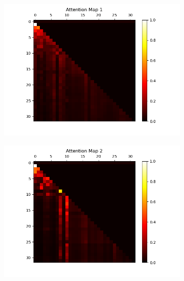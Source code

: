 \documentclass[10pt]{article}
\theoremstyle{definition}
\begin{document}
\begin{figure}[H]
    \centering
    \begin{subfigure}[b]{0.35\textwidth}
        \centering
        \includegraphics[width=\textwidth]{../data/plots/part2/attention_map_1.png}
        \label{subfig:am1}
    \end{subfigure}
    \begin{subfigure}[b]{0.35\textwidth}
        \centering
        \includegraphics[width=\textwidth]{../data/plots/part2/attention_map_2.png}
        \label{subfig:am2}
    \end{subfigure}
    \begin{subfigure}[b]{0.35\textwidth}
        \centering

\end{subfigure}
\end{figure}
\end{document}
